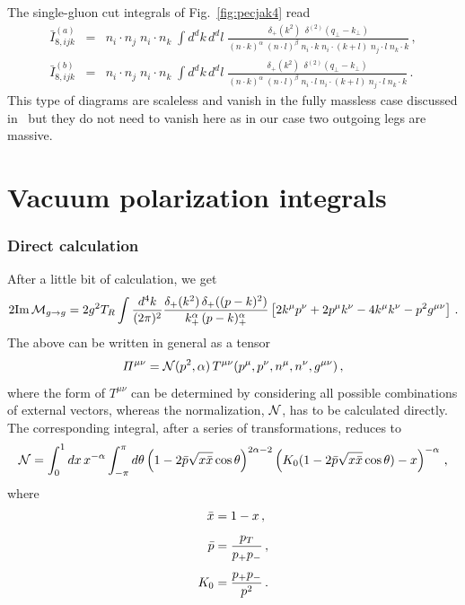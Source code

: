 \documentclass[a4paper,11pt]{article}
\numberwithin{equation}{section}
\begin{document}
The single-gluon cut integrals of Fig.~\ref{fig:pecjak4} read
%
\begin{eqnarray}
  \bar{I}_{8, ijk}^{(a)} &= &
  n_i \cdot n_j\; n_i \cdot n_k\; 
  \int d^d k\, d^d l\; 
  \frac{\delta_+(k^2) \,
    \; \delta^{(2)}(q_\perp-k_\perp)}
    {(n \cdot k)^\alpha\; (n \cdot l)^\beta \; 
    n_i \cdot k \; n_i \cdot (k+l) \; n_j \cdot l \; n_k \cdot k} \,,
  \\
  \bar{I}_{8, ijk}^{(b)} &= &
  n_i \cdot n_j\; n_i \cdot n_k\; 
  \int d^d k\, d^d l\; 
  \frac{\delta_+(k^2) \,
    \; \delta^{(2)}(q_\perp-k_\perp)}
    {(n \cdot k)^\alpha\; (n \cdot l)^\beta \; 
    n_i \cdot l \; n_i \cdot (k+l) \; n_j \cdot l \; n_k \cdot k} \,.
\end{eqnarray}
%
This type of diagrams are scaleless and vanish in the fully massless case
discussed in~\cite{Ferroglia:2012uy} but they do not need to vanish here as in
our case two outgoing legs are massive. 

\section{Vacuum polarization integrals}
\subsubsection{Direct calculation}

After a little bit of calculation, we get
%
\begin{equation}
  2\text{Im}\, {\cal M}_{g\to g} =  
  2 g^2 T_R \int\frac{d^4 k}{(2\pi)^2}
  \frac{\delta_+(k^2)\, \delta_+((p-k)^2)}{k_+^\alpha\, (p-k)_+^\alpha}
  \left[
    2k^\mu p^\nu + 2p^\mu k^\nu - 4 k^\mu k^\nu - p^2 g^{\mu\nu}
  \right]\,.
\end{equation}
% 
The above can be written in general as a tensor
%
\begin{equation}
  \Pi^{\mu\nu} = {\cal N} (p^2, \alpha)\, 
  T^{\mu\nu} (p^\mu,p^\nu, n^\mu, n^\nu, g^{\mu\nu})\,,
\end{equation}
%
where the form of $T^{\mu\nu}$ can be determined by considering all possible
combinations of external vectors, whereas the normalization, ${\cal N} $, has to be
calculated directly. The corresponding integral, after a series of
transformations, reduces to 
%
\begin{equation}
  {\cal N} = 
  \int_0^1 d x\, x^{-\alpha}\int_{-\pi}^\pi d\theta
  \left(1-2\bar{p} \sqrt{x {\bar x}}\cos\theta\right)^{2\alpha-2}
  \left(K_0(1-2\bar{p} \sqrt{x {\bar x}}\cos\theta)-x\right)^{-\alpha}\,,
\end{equation}
%
where
\begin{align}
  {\bar x} &= 1 - x\,, \\[0.5em]
  \bar{p} &= \frac{p_T}{p_+ p_-}\,, \\[0.5em]
  K_0   &= \frac{p_+ p_-}{p^2}\,.
\end{align}





\end{document}
